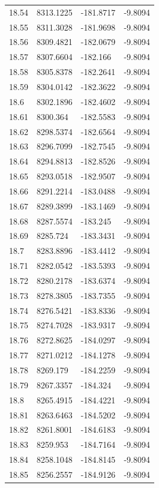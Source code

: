\begin{table}[H]
\begin{tabular}{llll}
18.54 & 8313.1225 & -181.8717 & -9.8094 \\
18.55 & 8311.3028 & -181.9698 & -9.8094 \\
18.56 & 8309.4821 & -182.0679 & -9.8094 \\
18.57 & 8307.6604 & -182.166 & -9.8094 \\
18.58 & 8305.8378 & -182.2641 & -9.8094 \\
18.59 & 8304.0142 & -182.3622 & -9.8094 \\
18.6 & 8302.1896 & -182.4602 & -9.8094 \\
18.61 & 8300.364 & -182.5583 & -9.8094 \\
18.62 & 8298.5374 & -182.6564 & -9.8094 \\
18.63 & 8296.7099 & -182.7545 & -9.8094 \\
18.64 & 8294.8813 & -182.8526 & -9.8094 \\
18.65 & 8293.0518 & -182.9507 & -9.8094 \\
18.66 & 8291.2214 & -183.0488 & -9.8094 \\
18.67 & 8289.3899 & -183.1469 & -9.8094 \\
18.68 & 8287.5574 & -183.245 & -9.8094 \\
18.69 & 8285.724 & -183.3431 & -9.8094 \\
18.7 & 8283.8896 & -183.4412 & -9.8094 \\
18.71 & 8282.0542 & -183.5393 & -9.8094 \\
18.72 & 8280.2178 & -183.6374 & -9.8094 \\
18.73 & 8278.3805 & -183.7355 & -9.8094 \\
18.74 & 8276.5421 & -183.8336 & -9.8094 \\
18.75 & 8274.7028 & -183.9317 & -9.8094 \\
18.76 & 8272.8625 & -184.0297 & -9.8094 \\
18.77 & 8271.0212 & -184.1278 & -9.8094 \\
18.78 & 8269.179 & -184.2259 & -9.8094 \\
18.79 & 8267.3357 & -184.324 & -9.8094 \\
18.8 & 8265.4915 & -184.4221 & -9.8094 \\
18.81 & 8263.6463 & -184.5202 & -9.8094 \\
18.82 & 8261.8001 & -184.6183 & -9.8094 \\
18.83 & 8259.953 & -184.7164 & -9.8094 \\
18.84 & 8258.1048 & -184.8145 & -9.8094 \\
18.85 & 8256.2557 & -184.9126 & -9.8094 \\

\end{tabular}
\end{table}

